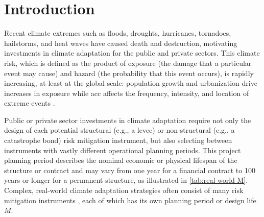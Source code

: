 \documentclass[
  draft,
  linenumbers
]{agujournal2018}
\makeatletter
\newcommand{\eg}{e.g.\@\xspace}
\makeatother
\begin{document}

\section{Introduction}\label{sec:introduction}

Recent climate extremes such as floods, droughts, hurricanes, tornadoes, hailstorms, and heat waves have caused death and destruction, motivating investments in climate adaptation for the public and private sectors.
This climate risk, which is  defined as the product of exposure (the damage that a particular event may cause) and hazard (the probability that this event occurs), is rapidly increasing, at least at the global scale: population growth and urbanization drive increases in exposure \citep{Jongman:2012cr} while \gls{acc} affects the frequency, intensity, and location of extreme events \citep{IPCC:2012wt, Merz:2014gf, Shaw:2016bo}.

Public or private sector investments in climate adaptation require not only the design of each potential structural (\eg, a levee) or non-structural (\eg, a catastrophe bond) risk mitigation instrument, but also selecting between instruments with vastly different operational planning periods.
This project planning period describes the nominal economic or physical lifespan of the structure or contract and may vary from one year for  a financial contract to 100 years or longer for a permanent structure, as illustrated in \cref{tab:real-world-M}.
Complex, real-world climate adaptation strategies often consist of many risk mitigation instruments \citep[\eg,][]{CityofNewYork:2013uh}, each of which has its own planning period or design life $M$.
\end{document}
